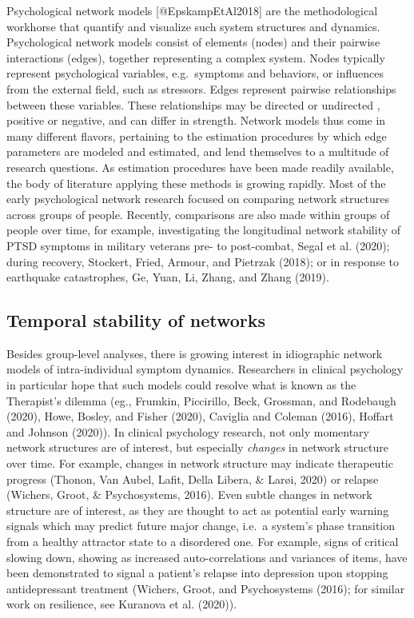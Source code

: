 \documentclass[
  english,
  man]{apa6}
\begin{document}
Psychological network models {[}@EpskampEtAl2018{]} are the methodological workhorse that quantify and visualize such system structures and dynamics.
Psychological network models consist of elements (nodes) and their pairwise interactions (edges), together representing a complex system.
Nodes typically represent psychological variables, e.g.~symptoms and behaviors, or influences from the external field, such as stressors.
Edges represent pairwise relationships between these variables.
These relationships may be directed or undirected , positive or negative, and can differ in strength.
Network models thus come in many different flavors, pertaining to the estimation procedures by which edge parameters are modeled and estimated, and lend themselves to a multitude of research questions.
As estimation procedures have been made readily available, the body of literature applying these methods is growing rapidly.
Most of the early psychological network research focused on comparing network structures across groups of people.
Recently, comparisons are also made within groups of people over time, for example, investigating the longitudinal network stability of PTSD symptoms in military veterans pre- to post-combat, Segal et al. (2020); during recovery, Stockert, Fried, Armour, and Pietrzak (2018); or in response to earthquake catastrophes, Ge, Yuan, Li, Zhang, and Zhang (2019).

\hypertarget{temporal-stability-of-networks}{%
\subsection{Temporal stability of networks}\label{temporal-stability-of-networks}}

Besides group-level analyses, there is growing interest in idiographic network models of intra-individual symptom dynamics.
Researchers in clinical psychology in particular hope that such models could resolve what is known as the Therapist's dilemma (eg., Frumkin, Piccirillo, Beck, Grossman, and Rodebaugh (2020), Howe, Bosley, and Fisher (2020), Caviglia and Coleman (2016), Hoffart and Johnson (2020)).
In clinical psychology research, not only momentary network structures are of interest, but especially \emph{changes} in network structure over time.
For example, changes in network structure may indicate therapeutic progress (Thonon, Van Aubel, Lafit, Della Libera, \& Larøi, 2020) or relapse (Wichers, Groot, \& Psychosystems, 2016).
Even subtle changes in network structure are of interest, as they are thought to act as potential early warning signals which may predict future major change, i.e.~a system's phase transition from a healthy attractor state to a disordered one.
For example, signs of critical slowing down, showing as increased auto-correlations and variances of items, have been demonstrated to signal a patient's relapse into depression upon stopping antidepressant treatment (Wichers, Groot, and Psychosystems (2016); for similar work on resilience, see Kuranova et al. (2020)).
\end{document}
